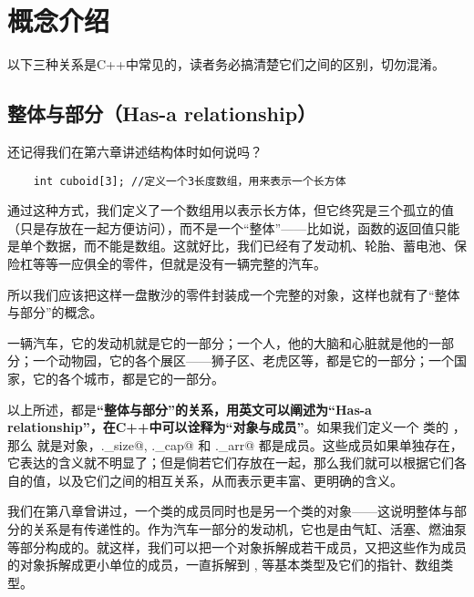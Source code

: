 \section{概念介绍}
以下三种关系是C++中常见的，读者务必搞清楚它们之间的区别，切勿混淆。\par
\subsection*{整体与部分（Has-a relationship）}
还记得我们在第六章讲述结构体时如何说吗？
\begin{lstlisting}
    int cuboid[3]; //定义一个3长度数组，用来表示一个长方体
\end{lstlisting}
通过这种方式，我们定义了一个数组用以表示长方体，但它终究是三个孤立的值（只是存放在一起方便访问），而不是一个``整体''——比如说，函数的返回值只能是单个数据，而不能是数组。这就好比，我们已经有了发动机、轮胎、蓄电池、保险杠等等一应俱全的零件，但就是没有一辆完整的汽车。\par
所以我们应该把这样一盘散沙的零件封装成一个完整的对象，这样也就有了``整体与部分''的概念。\par
一辆汽车，它的发动机就是它的一部分；一个人，他的大脑和心脏就是他的一部分；一个动物园，它的各个展区——狮子区、老虎区等，都是它的一部分；一个国家，它的各个城市，都是它的一部分。\par
以上所述，都是\textbf{``整体与部分''的关系，用英文可以阐述为``Has-a relationship''，在C++中可以诠释为``对象与成员''}。如果我们定义一个 \lstinline@valarri@ 类的 \lstinline@a@，那么 \lstinline@a@ 就是对象，\lstinline@a._size@, \lstinline@a._cap@ 和 \lstinline@a._arr@ 都是成员。这些成员如果单独存在，它表达的含义就不明显了；但是倘若它们存放在一起，那么我们就可以根据它们各自的值，以及它们之间的相互关系，从而表示更丰富、更明确的含义。\par
我们在第八章曾讲过，一个类的成员同时也是另一个类的对象——这说明整体与部分的关系是有传递性的。作为汽车一部分的发动机，它也是由气缸、活塞、燃油泵等部分构成的。就这样，我们可以把一个对象拆解成若干成员，又把这些作为成员的对象拆解成更小单位的成员，一直拆解到 \lstinline@int@, \lstinline@double@ 等基本类型及它们的指针、数组类型。\par
